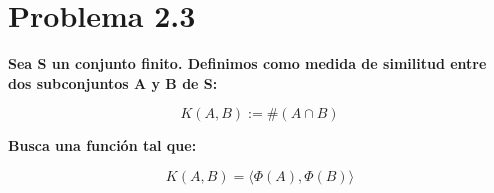 \section*{Problema 2.3}

\textbf{Sea S un conjunto finito. Definimos como medida de similitud entre
    dos subconjuntos A y B de S:}

\begin{equation*}
    K(A,B) := \#(A \cap B)
\end{equation*}

\textbf{Busca una función tal que:}

\begin{equation*}
    K(A,B ) = \langle \Phi(A), \Phi(B)\rangle
\end{equation*}
